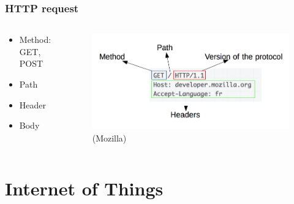 \documentclass[compress, aspectratio=32]{beamer}
\begin{document}
\begin{frame}
    \frametitle{HTTP request}
    \begin{columns}
        \begin{column}[]{0.5\textwidth}
            \begin{itemize}
                \item Method: GET, POST
                \item Path
                \item Header
                \item Body
            \end{itemize}
        \end{column}
        \begin{column}[]{0.5\textwidth}
            \begin{figure}
                \includegraphics[width=\textwidth]{http_request.png}
                \caption*{(Mozilla)}
            \end{figure}
        \end{column}
    \end{columns}
\end{frame}

\section[IoT]{Internet of Things}
\end{document}
